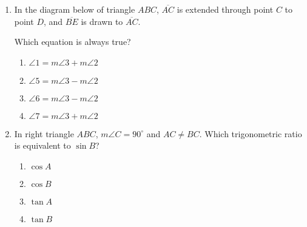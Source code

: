 \documentclass[12pt, oneside]{article}
\begin{document}
\begin{enumerate}[itemsep=2cm]
\item In the diagram below of triangle $ABC$, $\overline{AC}$ is extended through point $C$ to point $D$, and $\overline{BE}$ is drawn to $\overline{AC}$.
  \begin{center}
  \end{center}
Which equation is always true?
\begin{multicols}{2}
  \begin{enumerate}
    \item $\angle 1 = m\angle 3 + m\angle 2$
    \item $\angle 5 = m\angle 3 - m\angle 2$ 
    \item $\angle 6 = m\angle 3 - m\angle 2$
    \item $\angle 7 = m\angle 3 + m\angle 2$
  \end{enumerate}
\end{multicols}

\newpage
\item In right triangle $ABC$, $m\angle C=90^\circ$ and $AC \ne BC$. Which trigonometric ratio is equivalent to $\sin B$?
\begin{multicols}{2}
  \begin{enumerate}
    \item $\cos A$
    \item $\cos B$
    \item $\tan A$
    \item $\tan B$
  \end{enumerate}
\end{multicols}


\end{enumerate}
\end{document}

